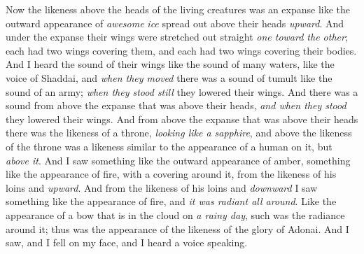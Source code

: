 \begin{biblechapter}
\verse Now the likeness above the heads of the living creatures was an expanse like the outward appearance of \textit{awesome} \textit{ice} spread out above their heads \textit{upward}.
\verse And under the expanse their wings were stretched out straight \textit{one toward the other}; each had two wings covering them, and each had two wings covering their bodies.
\verse And I heard the sound of their wings like the sound of many waters, like the voice of Shaddai, and \textit{when they moved} there was a sound of tumult like the sound of an army; \textit{when they stood still} they lowered their wings.
\verse And there was a sound from above the expanse that was above their heads, \textit{and when they stood} they lowered their wings.
\verse And from above the expanse that was above their heads there was the likeness of a throne, \textit{looking like a sapphire}, and above the likeness of the throne was a likeness similar to the appearance of a human on it, but \textit{above it}.
\verse And I saw something like the outward appearance of amber, something like the appearance of fire, with a covering around it, from the likeness of his loins and \textit{upward}. And from the likeness of his loins and \textit{downward} I saw something like the appearance of fire, and \textit{it was radiant all around}.
\verse Like the appearance of a bow that is in the cloud on \textit{a rainy day}, such was the radiance around it; thus was the appearance of the likeness of the glory of Adonai. And I saw, and I fell on my face, and I heard a voice speaking.
\end{biblechapter}

